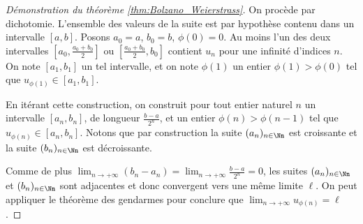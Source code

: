 \documentclass[class=report,crop=false]{standalone}
\begin{document}
\begin{proof}[Démonstration du théorème \ref{thm:Bolzano_Weierstrass}]
On procède par dichotomie. L'ensemble des valeurs de la suite est par hypothèse
contenu dans un intervalle $[a,b]$. Posons $a_0=a$, $b_0=b$, $\phi(0)=0$.
Au moins l'un des deux intervalles $\left[a_0, \frac{a_0+b_0}{2}\right]$ ou
$\left[\frac{a_0+b_0}{2},b_0 \right]$ contient $u_n$ pour une infinité d'indices $n$.
On note $[a_1,b_1]$ un tel intervalle, et on note $\phi(1)$ un entier $\phi(1)>\phi(0)$
tel que $u_{\phi(1)}\in [a_1,b_1]$.


En itérant cette construction,
on construit pour tout entier naturel $n$ un intervalle $[a_n,b_n]$,
de longueur $\frac{b-a}{2^n}$, et un entier $\phi(n)>\phi(n-1)$ tel que $u_{\phi(n)}\in [a_n,b_n]$.
Notons que par construction la suite $(a_n)_{n\in \Nn}$ est croissante et la suite
$(b_n)_{n\in \Nn}$ est décroissante.


Comme de plus $\lim_{n\to +\infty} (b_n-a_n)=
 \lim_{n\to +\infty} \frac{b-a}{2^n}=0$, les suites $(a_n)_{n\in \Nn}$ et
$(b_n)_{n\in \Nn}$ sont adjacentes et donc convergent vers une même limite $\ell$.
On peut appliquer le théorème \og des gendarmes \fg{} pour conclure que
$\lim_{n\to +\infty} u_{\phi(n)}=\ell$.
\end{proof}




\end{document}
